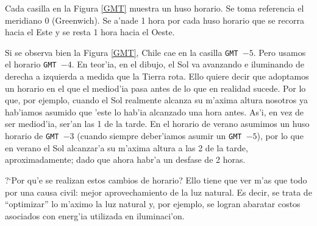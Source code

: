 \documentclass{article}
\begin{document}
Cada casilla en la Figura \ref{GMT} muestra un huso horario. Se toma referencia el meridiano 0 (Greenwich). Se a'nade 1 hora por cada huso horario que se recorra hacia el Este y se resta 1 hora hacia el Oeste.

Si se observa bien la Figura \ref{GMT}, Chile cae en la casilla \texttt{GMT $-5$}. Pero usamos el horario  \texttt{GMT $-4$}. En teor'ia, en el dibujo, el Sol va avanzando e iluminando de derecha a izquierda a medida que la Tierra rota. Ello quiere decir que adoptamos un horario en el que el mediod'ia pasa antes de lo que en realidad sucede. Por lo que, por ejemplo, cuando el Sol realmente alcanza su m'axima altura nosotros ya hab'iamos asumido que 'este lo hab'ia alcanzado una hora antes. As'i, en vez de ser mediod'ia, ser'an las 1 de la tarde. En el horario de verano asumimos un huso horario de \texttt{GMT $-3$} (cuando siempre deber'iamos asumir un \texttt{GMT $-5$}), por lo que en verano el Sol alcanzar'a su m'axima altura a las 2 de la tarde, aproximadamente; dado que ahora habr'a un desfase de 2 horas.

?`Por qu'e se realizan estos cambios de horario? Ello tiene que ver m'as que todo por una causa civil: mejor aprovechamiento de la luz natural. Es decir, se trata de ``optimizar'' lo m'aximo la luz natural y, por ejemplo, se logran abaratar costos asociados con energ'ia utilizada en iluminaci'on.
\end{document}
